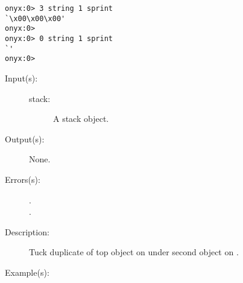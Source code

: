 \begin{description}
\begin{description}
\begin{verbatim}
onyx:0> 3 string 1 sprint
`\x00\x00\x00'
onyx:0>
onyx:0> 0 string 1 sprint
`'
onyx:0>
		\end{verbatim}
	\end{description}
\label{systemdict:stuck}
\item[{\onyxop{stack}{stuck}{--}}: ]
	\begin{description}\item[]
	\item[Input(s): ]
		\begin{description}\item[]
		\item[stack: ]
			A stack object.
		\end{description}
	\item[Output(s): ] None.
	\item[Errors(s): ]
		\begin{description}\item[]
		\item[.]
		\item[.]
		\end{description}
	\item[Description: ]
		Tuck duplicate of top object on  under second
		object on .
	\item[Example(s): ]\begin{verbatim}


\end{verbatim}
\end{description}
\end{description}
